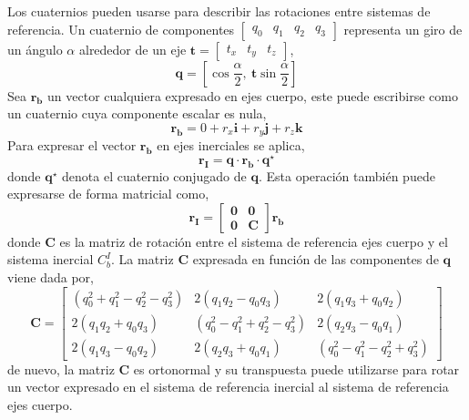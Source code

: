\documentclass[a4paper,12pt]{book}
\begin{document}
Los cuaternios pueden usarse para describir las rotaciones entre sistemas de referencia. Un cuaternio de componentes $\begin{bmatrix} q_0 & q_1 & q_2 &q_3\end{bmatrix}$ representa un giro de un ángulo $\alpha$ alrededor de un eje $\mathbf{t} = \begin{bmatrix}t_x & t_y & t_z\end{bmatrix}$,
\begin{equation}
    \mathbf{q} = \left[\cos\frac{\alpha}{2},\>\mathbf{t}\sin\frac{\alpha}{2}\right]
\end{equation}
Sea $\mathbf{r_b}$ un vector cualquiera expresado en ejes cuerpo, este puede escribirse como un cuaternio cuya componente escalar es nula,
\begin{equation}
    \mathbf{r_b} = 0 + r_x\mathbf{i} + r_y\mathbf{j} + r_z\mathbf{k}
\end{equation}
Para expresar el vector $\mathbf{r_b}$ en ejes inerciales se aplica,
\begin{equation}
    \mathbf{r_I} = \mathbf{q\cdot r_b\cdot q^\star}
\end{equation}
donde $\mathbf{q^\star}$ denota el cuaternio conjugado de $\mathbf{q}$. Esta operación también puede expresarse de forma matricial como,
\begin{equation}
    \mathbf{r_I = \begin{bmatrix} 0 & 0 \\ 0 & C\end{bmatrix}r_b}
\end{equation}
donde $\mathbf{C}$ es la matriz de rotación entre el sistema de referencia ejes cuerpo y el sistema inercial $C_b^I$. La matriz $\mathbf{C}$ expresada en función de las componentes de $\mathbf{q}$ viene dada por,
\begin{equation}
    \mathbf{C} = \begin{bmatrix} (q_0^2 + q_1^2 - q_2^2 - q_3^2) & 2(q_1q_2 - q_0q_3) & 2(q_1q_3 + q_0q_2) \\ 2(q_1q_2 + q_0q_3) & (q_0^2 - q_1^2 + q_2^2 - q_3^2) & 2(q_2q_3 - q_0q_1) \\ 2(q_1q_3 - q_0q_2) & 2(q_2q_3 + q_0q_1) & (q_0^2 - q_1^2 - q_2^2 + q_3^2)     \end{bmatrix}
\end{equation}
de nuevo, la matriz $\mathbf{C}$ es ortonormal y su transpuesta puede utilizarse para rotar un vector expresado en el sistema de referencia inercial al sistema de referencia ejes cuerpo.
\end{document}
